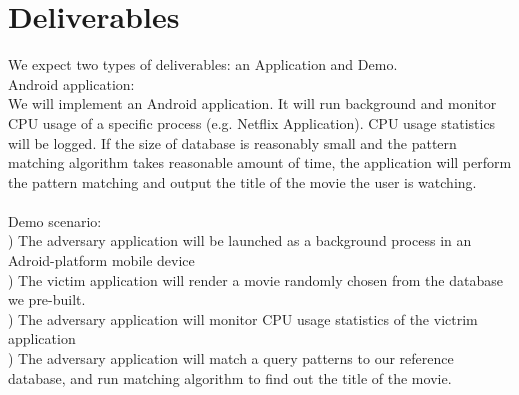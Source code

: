 \section{Deliverables}
\label{sec:deliverables}
\indent We expect two types of deliverables: an Application and Demo.\\
Android application: \\
\indent We will implement an Android application.
It will run background and monitor CPU usage of a specific process (e.g. Netflix Application).
CPU usage statistics will be logged.
If the size of database is reasonably small and the pattern matching algorithm takes reasonable amount of time, 
the application will perform the pattern matching and output the title of the movie the user is watching. 
\\\\
Demo scenario: \\
) The adversary application will be launched as a background process in an Adroid-platform mobile device\\
) The victim application will render a movie randomly chosen from the database we pre-built. \\
) The adversary application will monitor CPU usage statistics of the victrim application\\
) The adversary application will match a query patterns to our reference database, and run matching algorithm to find out the title of the movie.\\



